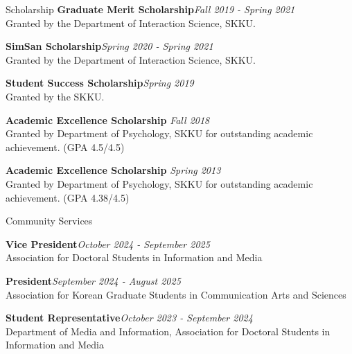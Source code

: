 \documentclass{resume} %
\begin{document}
\begin{rSection}{Scholarship}
{\bf Graduate Merit Scholarship}\hfill {\em Fall 2019 - Spring 2021} 
\\ Granted by the Department of Interaction Science, SKKU.

{\bf SimSan Scholarship}\hfill {\em Spring 2020 - Spring 2021} 
\\ Granted by the Department of Interaction Science, SKKU.

{\bf Student Success Scholarship}\hfill {\em Spring 2019} 
\\ Granted by the SKKU.

{\bf Academic Excellence Scholarship} \hfill {\em Fall 2018} 
\\ Granted by Department of Psychology, SKKU for outstanding academic achievement. (GPA 4.5/4.5)

{\bf Academic Excellence Scholarship} \hfill {\em Spring 2013} 
\\ Granted by Department of Psychology, SKKU for outstanding academic achievement. (GPA 4.38/4.5)





\end{rSection}


\begin{rSection}{Community Services}

{\bf Vice President}\hfill {\em October 2024 - September 2025} 
\\ Association for Doctoral Students in Information and Media

{\bf President}\hfill {\em September 2024 - August 2025} 
\\ Association for Korean Graduate Students in Communication Arts and Sciences

{\bf Student Representative}\hfill {\em October 2023 - September 2024} 
\\ Department of Media and Information, Association for Doctoral Students in Information and Media

\end{rSection}
\end{document}
